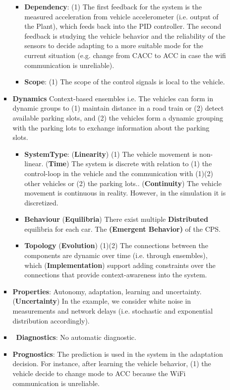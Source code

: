 \begin{itemize}
\begin{itemize}
\begin{itemize}
\begin{itemize}
                \item \checkmark\textbf{Dependency}: (1) The first feedback for the system is the measured acceleration from vehicle accelerometer (i.e. output of the Plant), which feeds back into the PID controller. The second feedback is studying the vehicle behavior and the reliability of the sensors to decide adapting to a more suitable mode for the current situation (e.g. change from CACC to ACC in case the wifi communication is unreliable). 
                \item \checkmark\textbf{Scope}: (1) The scope of the control signals is local to the vehicle.
            \end{itemize}
            \item \checkmark\textbf{Dynamics} Context-based ensembles i.e. The vehicles can form in dynamic groups to (1) maintain distance in a road train or (2) detect available parking slots, and (2) the vehicles form a dynamic grouping with the parking lots to exchange information about the parking slots. 
            \begin{itemize}
                \item \checkmark \textbf{SystemType}: (\textbf{Linearity}) (1) The vehicle movement is non-linear. (\textbf{Time}) The system is discrete with relation to (1) the control-loop in the vehicle and the communication with (1)(2) other vehicles or (2) the parking lots.. (\textbf{Continuity}) The vehicle movement is continuous in reality. However, in the simulation it is discretized. 
                \item \textbf{Behaviour} (\textbf{Equilibria}) There exist multiple \textbf{Distributed} equilibria for each car. The \textbf{(Emergent Behavior)} of the CPS. 
                \item \textbf{Topology} (\textbf{Evolution}) (1)(2) The connections between the components are dynamic over time (i.e. through ensembles), which (\textbf{Implementation}) support adding constraints over the connections that provide context-awareness into the system.
            \end{itemize}
            \item \checkmark \textbf{Properties}: Autonomy, adaptation, learning and uncertainty. (\textbf{Uncertainty}) In the example, we consider white noise in measurements and network delays (i.e. stochastic and exponential distribution accordingly).
            \item \xmark\ \textbf{Diagnostics}: No automatic diagnostic. 
            \item \checkmark \textbf{Prognostics}: The prediction is used in the system in the adaptation decision. For instance, after learning the vehicle behavior, (1) the vehicle decide to change mode to ACC because the WiFi communication is unreliable. 

\end{itemize}
\end{itemize}
\end{itemize}

